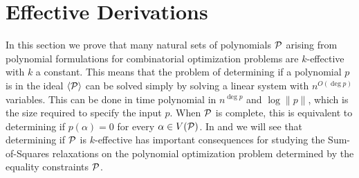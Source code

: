 \chapter{Effective Derivations}\label{cha:effective_derivations}
In this section we prove that many natural sets of polynomials $\mathcal P$ arising from polynomial formulations for combinatorial optimization problems are $k$-effective with $k$ a constant. This means that the problem of determining if a polynomial $p$ is in the ideal $\langle \mathcal P \rangle$ can be solved simply by solving a linear system with $n^{O(\deg p)}$ variables. This can be done in time polynomial in $n^{\deg p}$ and $\log \|p\|$, which is the size required to specify the input $p$. When $\mathcal P$ is complete, this is equivalent to determining if $p(\alpha) = 0$ for every $\alpha \in V(\mathcal P)$. In  and  we will see that determining if $\mathcal P$ is $k$-effective has important consequences for studying the Sum-of-Squares relaxations on the polynomial optimization problem determined by the equality constraints $\mathcal P$. 

